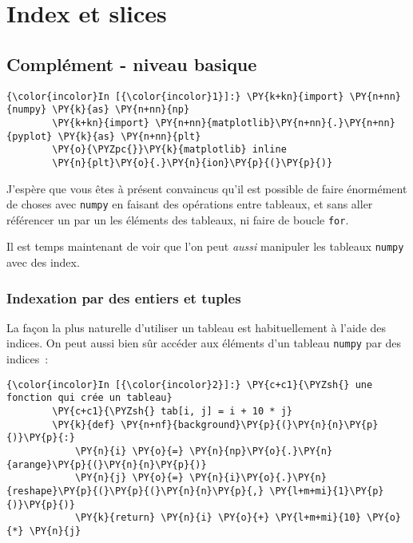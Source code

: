     
    
    
    

    

    \hypertarget{index-et-slices}{%
\section{Index et slices}\label{index-et-slices}}

    \hypertarget{compluxe9ment---niveau-basique}{%
\subsection{Complément - niveau
basique}\label{compluxe9ment---niveau-basique}}

    \begin{Verbatim}[commandchars=\\\{\},frame=single,framerule=0.3mm,rulecolor=\color{cellframecolor}]
{\color{incolor}In [{\color{incolor}1}]:} \PY{k+kn}{import} \PY{n+nn}{numpy} \PY{k}{as} \PY{n+nn}{np}
        \PY{k+kn}{import} \PY{n+nn}{matplotlib}\PY{n+nn}{.}\PY{n+nn}{pyplot} \PY{k}{as} \PY{n+nn}{plt}
        \PY{o}{\PYZpc{}}\PY{k}{matplotlib} inline
        \PY{n}{plt}\PY{o}{.}\PY{n}{ion}\PY{p}{(}\PY{p}{)}
\end{Verbatim}


    J'espère que vous êtes à présent convaincus qu'il est possible de faire
énormément de choses avec \texttt{numpy} en faisant des opérations entre
tableaux, et sans aller référencer un par un les éléments des tableaux,
ni faire de boucle \texttt{for}.

Il est temps maintenant de voir que l'on peut \emph{aussi} manipuler les
tableaux \texttt{numpy} avec des index.

    \hypertarget{indexation-par-des-entiers-et-tuples}{%
\subsubsection{Indexation par des entiers et
tuples}\label{indexation-par-des-entiers-et-tuples}}

    La façon la plus naturelle d'utiliser un tableau est habituellement à
l'aide des indices. On peut aussi bien sûr accéder aux éléments d'un
tableau \texttt{numpy} par des indices~:

    \begin{Verbatim}[commandchars=\\\{\},frame=single,framerule=0.3mm,rulecolor=\color{cellframecolor}]
{\color{incolor}In [{\color{incolor}2}]:} \PY{c+c1}{\PYZsh{} une fonction qui crée un tableau}
        \PY{c+c1}{\PYZsh{} tab[i, j] = i + 10 * j}
        \PY{k}{def} \PY{n+nf}{background}\PY{p}{(}\PY{n}{n}\PY{p}{)}\PY{p}{:}
            \PY{n}{i} \PY{o}{=} \PY{n}{np}\PY{o}{.}\PY{n}{arange}\PY{p}{(}\PY{n}{n}\PY{p}{)}
            \PY{n}{j} \PY{o}{=} \PY{n}{i}\PY{o}{.}\PY{n}{reshape}\PY{p}{(}\PY{p}{(}\PY{n}{n}\PY{p}{,} \PY{l+m+mi}{1}\PY{p}{)}\PY{p}{)}
            \PY{k}{return} \PY{n}{i} \PY{o}{+} \PY{l+m+mi}{10} \PY{o}{*} \PY{n}{j}
\end{Verbatim}


